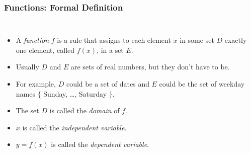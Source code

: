 \documentclass[serif,ignorenonframetext]{beamer}
\begin{document}
\begin{frame}
  \frametitle{Functions: Formal Definition}
  \begin{columns}
  \begin{itemize}[<+->]
  \item A \textit{function} $f$ is a rule that assigns to each element
    $x$ in some set $D$ exactly one element, called $f(x)$, in a set
    $E$.
  \item Usually $D$ and $E$ are sets of real numbers, but they don't
    have to be.
  \item For example, $D$ could be a set of dates and $E$ could be the
    set of weekday names $\{$ Sunday, \ldots, Saturday $\}$.
  \item The set $D$ is called the \textit{domain} of $f$.
  \item $x$ is called the \textit{independent variable}.
  \item $y=f(x)$ is called the \textit{dependent variable}.
  \end{itemize}
  \end{columns}
\end{frame}

\end{document}
